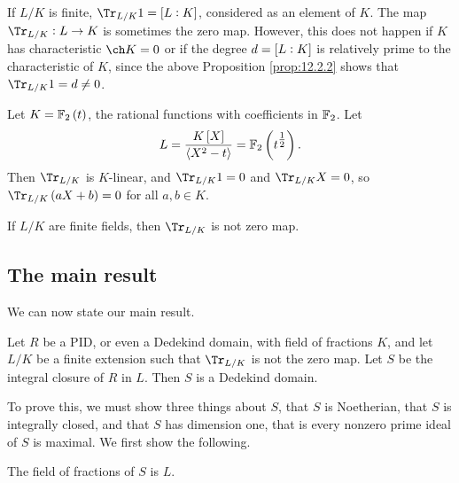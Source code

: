 \begin{remark}
If $ L / K $ is finite, $ \Tr_{L / K} 1 = \sbr{L : K} $, considered as an element of $ K $. The map $ \Tr_{L / K} : L \to K $ is sometimes the zero map. However, this does not happen if $ K $ has characteristic $ \ch K = 0 $ or if the degree $ d = \sbr{L : K} $ is relatively prime to the characteristic of $ K $, since the above Proposition \ref{prop:12.2.2} shows that $ \Tr_{L / K} 1 = d \ne 0 $.
\end{remark}

\begin{example*}
Let $ K = \FF_2\br{t} $, the rational functions with coefficients in $ \mathbb{F}_2 $. Let
$$ L = \dfrac{K\sbr{X}}{\abr{X^2 - t}} = \FF_2\br{t^{\tfrac{1}{2}}}. $$
Then $ \Tr_{L / K} $ is $ K $-linear, and $ \Tr_{L / K} 1 = 0 $ and $ \Tr_{L / K} X = 0 $, so $ \Tr_{L / K} \br{aX + b} = 0 $ for all $ a, b \in K $.
\end{example*}

\begin{proposition}
If $ L / K $ are finite fields, then $ \Tr_{L / K} $ is not zero map.
\end{proposition}

\pagebreak

\subsection{The main result}

We can now state our main result.

\begin{theorem}
Let $ R $ be a PID, or even a Dedekind domain, with field of fractions $ K $, and let $ L / K $ be a finite extension such that $ \Tr_{L / K} $ is not the zero map. Let $ S $ be the integral closure of $ R $ in $ L $. Then $ S $ is a Dedekind domain.
\end{theorem}

To prove this, we must show three things about $ S $, that $ S $ is Noetherian, that $ S $ is integrally closed, and that $ S $ has dimension one, that is every nonzero prime ideal of $ S $ is maximal. We first show the following.

\begin{lemma}
The field of fractions of $ S $ is $ L $.
\end{lemma}

